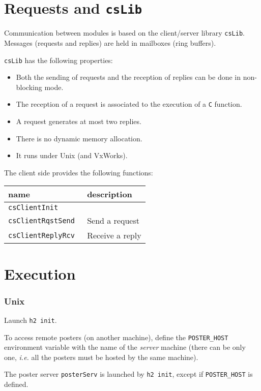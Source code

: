 \section{Requests and \texttt{csLib}}

Communication between modules is based  on the client/server library 
\texttt{csLib}. Messages   (requests and replies)  are   held in mailboxes  (ring
buffers).

\texttt{csLib} has the following properties:
\begin{itemize}
\item Both the sending of requests and the reception of replies can be
done in non-blocking mode.
\item The reception of a request is associated to the execution of a 
\texttt{C} function.
\item A request generates at most two replies.
\item There is no dynamic memory allocation.
\item It runs under Unix (and VxWorks).
\end{itemize}

The client side provides the following functions:

\begin{center}\small\begin{tabularx}{\linewidth}{|l|X|}
\hline
name		& description \\
\hline
\tt csClientInit 	& \\
\tt csClientRqstSend 	& Send a request\\
\tt csClientReplyRcv 	& Receive a reply\\
\hline
\end{tabularx}\end{center}


\section{Execution}

\subsubsection{Unix} Launch \texttt{h2 init}.

To  access   remote posters   (on  another  machine),  define    the 
\texttt{POSTER\_HOST} environment  variable  with the  name  of the \emph{server}
machine (there can be only one, \emph{i.e.} all the posters must be hosted
by the same machine).

The  poster server \texttt{posterServ} is  launched by \texttt{h2 init}, except
if \texttt{POSTER\_HOST} is defined.

